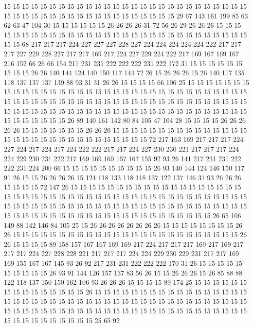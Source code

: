 15 15 15 15 15 15 15 15 15 15 15 15 15 15 15 15 15 15 15 15
15 15 15 15 15 15 15 15 15 15 15 15 15 15 15 15 15 15 15 15
15 15 15 15 15 15 29 67 143 161 199 85 63 62 63 47 104 30 15 15
15 15 15 15 26 26 26 26 31 72 56 26 29 26 26 26 15 15 15 15
15 15 15 15 15 15 15 15 15 15 15 15 15 15 15 15 15 15 15 15
15 15 15 15 15 15 15 15 68 217 217 217 224 227 227 227 228 227 224 224
224 224 224 222 217 217 217 227 229 228 227 217 217 169 217 224 227 229 224 222
217 169 167 169 167 216 152 66 26 66 154 217 231 231 222 222 222 231 222 172
31 15 15 15 15 15 15 15 15 15 26 26 140 144 124 140 150 117 144 72
26 15 26 26 26 15 26 140 117 135 118 137 137 137 139 88 93 31 31 26
26 15 15 15 15 66 106 25 15 15 15 15 15 15 15 15 15 15 15 15
15 15 15 15 15 15 15 15 15 15 15 15 15 15 15 15 15 15 15 15
15 15 15 15 15 15 15 15 15 15 15 15 15 15 15 15 15 15 15 15
15 15 15 15 15 15 15 15 15 15 15 15 15 15 15 15 15 15 15 15
15 15 15 15 15 15 15 15 15 15 15 15 15 15 15 15 15 15 15 15
15 15 15 26 89 140 161 142 80 84 105 47 104 28 15 15 15 15 26 26
26 26 26 15 15 15 15 15 15 15 26 26 26 15 15 15 15 15 15 15
15 15 15 15 15 15 15 15 15 15 15 15 15 15 15 15 15 15 15 15
15 15 15 15 72 217 163 169 217 217 217 224 227 224 217 224 217 224 222 222
217 217 224 227 230 230 221 217 217 217 224 224 229 230 231 222 217 169 169 169
157 167 155 92 93 26 141 217 231 231 222 222 231 224 200 66 15 15 15 15
15 15 15 15 15 15 26 93 140 144 124 146 150 117 91 26 15 15 26 26
26 26 15 124 118 133 118 118 137 122 137 146 31 93 26 26 26 15 15 15
15 72 147 26 15 15 15 15 15 15 15 15 15 15 15 15 15 15 15 15
15 15 15 15 15 15 15 15 15 15 15 15 15 15 15 15 15 15 15 15
15 15 15 15 15 15 15 15 15 15 15 15 15 15 15 15 15 15 15 15
15 15 15 15 15 15 15 15 15 15 15 15 15 15 15 15 15 15 15 15
15 15 15 15 15 15 15 15 15 15 15 15 15 15 15 15 15 15 15 15
26 65 106 149 88 142 146 84 105 25 15 26 26 26 26 26 26 26 26 15
15 15 15 15 15 15 15 26 26 15 15 15 15 15 15 15 15 15 15 15
15 15 15 15 15 15 15 15 15 15 15 15 15 15 26 26 15 15 15 15
89 158 157 167 167 169 169 217 224 217 217 217 169 217 169 217 217 217 224 227
228 228 221 217 217 217 224 224 229 230 229 231 217 217 169 169 155 167 167 145
93 26 92 217 231 231 222 222 222 170 31 26 15 15 15 15 15 15 15 15
15 15 26 93 91 144 126 157 137 83 56 26 15 15 26 26 26 15 26 85
88 88 122 118 137 150 150 162 106 93 26 26 26 15 15 15 15 89 174 25
15 15 15 15 15 15 15 15 15 15 15 15 15 15 15 26 15 15 15 15
15 15 15 15 15 15 15 15 15 15 15 15 15 15 15 15 15 15 15 15
15 15 15 15 15 15 15 15 15 15 15 15 15 15 15 15 15 15 15 15
15 15 15 15 15 15 15 15 15 15 15 15 15 15 15 15 15 15 15 15
15 15 15 15 15 15 15 15 15 15 15 15 15 15 15 15 15 25 65 92
